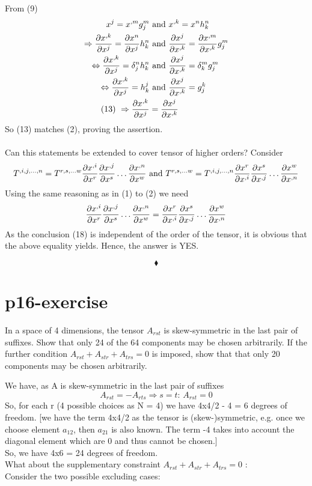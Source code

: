 From (9)
\begin{align}
\ x^{j} = x^{,m} g^m_j &\text{ and } x^{,k} = x^{n} h^n_k\\
\Rightarrow \pdv{x^{,k}}{x^j} = \pdv{x^{n}}{x^j} h^n_k  &\text{ and } \pdv{x^{j}}{x^{,k}} = \pdv{x^{,m}}{x^{,k}}g^m_j\\
\Leftrightarrow \pdv{x^{,k}}{x^j} = \delta^n_j h^n_k  &\text{ and } \pdv{x^{j}}{x^{,k}} = \delta^m_k g^m_j\\
\Leftrightarrow \pdv{x^{,k}}{x^j} = h^j_k  &\text{ and } \pdv{x^{j}}{x^{,k}} = g^k_j\\
\text{(13) }\Rightarrow \pdv{x^{,k}}{x^j} &= \pdv{x^{j}}{x^{,k}}
\end{align}
So (13) matches (2), proving the assertion.\\\\
Can this statements be extended to cover tensor of higher orders?
Consider
$$T^{,i,j,\dots ,n}= T^{r,s,\dots w} \pdv{x^{,i}}{x^{r}}\pdv{x^{,j}}{x^{s}}\dots \pdv{x^{,n}}{x^{w}} \text{ and } T^{r,s,\dots w}= T^{,i,j,\dots ,n} \pdv{x^{r}}{x^{,i}}\pdv{x^{s}}{x^{,j}}\dots \pdv{x^{w}}{x^{,n}}$$
Using the same reasoning as in (1) to (2) we need
$$\pdv{x^{,i}}{x^{r}}\pdv{x^{,j}}{x^{s}}\dots \pdv{x^{,n}}{x^{w}} =\pdv{x^{r}}{x^{,i}}\pdv{x^{s}}{x^{,j}}\dots \pdv{x^{w}}{x^{,n}}$$
As the conclusion (18) is independent of the order of the tensor, it is obvious that the above equality yields. Hence, the answer is YES.

$$\blacklozenge$$
\pagebreak[4]

\section{p16-exercise}

\begin{tcolorbox}
In a space of 4 dimensions, the tensor $A_{rst}$ is skew-symmetric in the last pair of suffixes. Show that only 24 of the 64 components may be chosen arbitrarily. If the further condition
$A_{rst} + A_{str}+A_{trs} =0$
is imposed, show that that only 20 components may be chosen arbitrarily.

\end{tcolorbox}
We have, as A is skew-symmetric in the last pair of suffixes
$$A_{rst} = -A_{rts}  \Rightarrow s=t \text{: } A_{rst} = 0 $$
So, for each r (4 possible choices as N = 4) we have 4x4/2 - 4 = 6 degrees of freedom. [we have the term 4x4/2  as the tensor is (skew-)symmetric, e.g. once we choose element $a_{12}$, then $a_{21}$ is also known. The term -4 takes into account the diagonal element which are 0 and thus cannot be chosen.]\\
So, we have 4x6 = 24 degrees of freedom.\\
What about the supplementary constraint $A_{rst} + A_{str}+A_{trs} =0 $       :\\
Consider the two possible excluding cases:\\

